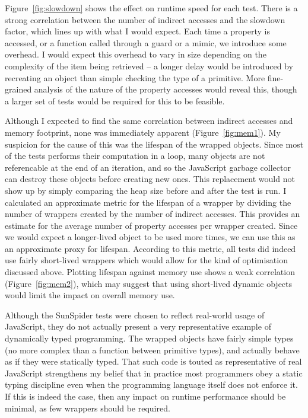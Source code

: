 \documentclass[12pt,a4paper,twoside,openright]{report}
\theoremstyle{definition}
\theoremstyle{dotless}
\begin{document}
Figure~\ref{fig:slowdown} shows the effect on runtime speed for each test. 
There is a strong correlation between the number of indirect accesses
and the slowdown factor, which lines up with what I would expect. Each time a
property is accessed, or a function called through a guard or a mimic, we 
introduce some overhead. I would expect this overhead to vary in size depending 
on the complexity of the item being retrieved -- a longer delay would be introduced
by recreating an object than simple checking the type of a primitive. More fine-grained
analysis of the nature of the property accesses would reveal this, though a larger
set of tests would be required for this to be feasible.

Although I expected to find the same correlation between indirect accesses and
memory footprint, none was immediately apparent (Figure~\ref{fig:mem1}). My
suspicion for the cause of this was the lifespan of the wrapped objects. Since
most of the tests performs their computation in a loop, many objects are not
referencable at the end of an iteration, and so the JavaScript garbage
collector can destroy these objects before creating new ones. This replacement
would not show up by simply comparing the heap size before and after the test
is run. I calculated an approximate metric for the lifespan of a wrapper by
dividing the number of wrappers created by the number of indirect accesses.
This provides an estimate for the average number of property accesses per
wrapper created. Since we would expect a longer-lived object to be used more
times, we can use this as an approximate proxy for lifespan. According to this
metric, all tests did indeed use fairly short-lived wrappers which would allow
for the kind of optimisation discussed above. Plotting lifespan against memory
use shows a weak correlation (Figure~\ref{fig:mem2}), which may suggest that
using short-lived dynamic objects would limit the impact on overall memory use.

Although the SunSpider tests were chosen to reflect real-world usage of
JavaScript, they do not actually present a very representative example of
dynamically typed programming. The wrapped objects have fairly simple types (no 
more complex than a function between primitive types), and actually behave 
as if they were statically typed. That such code is touted as representative of
real JavaScript strengthens my belief that in practice most programmers obey a 
static typing discipline even when the programming language itself does not enforce it.
If this is indeed the case, then any impact on runtime performance should be minimal,
as few wrappers should be required.
\end{document}
